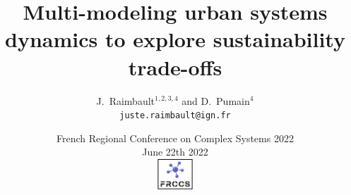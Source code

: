 \documentclass[english,11pt]{beamer}
\begin{document}
\title{Multi-modeling urban systems dynamics to explore sustainability trade-offs}

\author{J.~Raimbault$^{1,2,3,4}$ and D.~Pumain$^4$\\
\texttt{juste.raimbault@ign.fr}
}




\date{French Regional Conference on Complex Systems 2022\\
June 22th 2022\\\bigskip
\includegraphics[width=0.1\textwidth]{figures/logoFRCCS}
}


\end{document}
